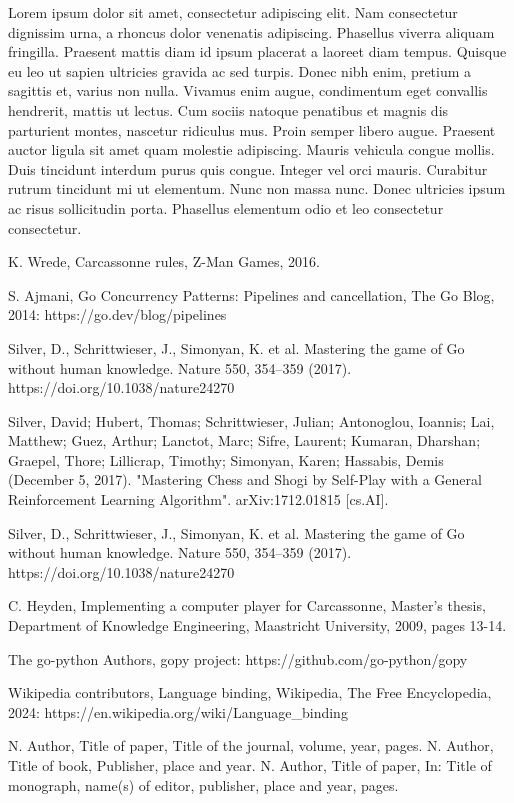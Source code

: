 \documentclass[11pt,twocolumn]{article}
\begin{document}
Lorem ipsum dolor sit amet, consectetur adipiscing elit. Nam consectetur dignissim urna, a rhoncus dolor venenatis adipiscing. Phasellus viverra aliquam fringilla. Praesent mattis diam id ipsum placerat a laoreet diam tempus. Quisque eu leo ut sapien ultricies gravida ac sed turpis. Donec nibh enim, pretium a sagittis et, varius non nulla. Vivamus enim augue, condimentum eget convallis hendrerit, mattis ut lectus. Cum sociis natoque penatibus et magnis dis parturient montes, nascetur ridiculus mus. Proin semper libero augue. Praesent auctor ligula sit amet quam molestie adipiscing. Mauris vehicula congue mollis. Duis tincidunt interdum purus quis congue. Integer vel orci mauris. Curabitur rutrum tincidunt mi ut elementum. Nunc non massa nunc. Donec ultricies ipsum ac risus sollicitudin porta. Phasellus elementum odio et leo consectetur consectetur. 


\begin{thebibliography}{00}
K. Wrede, Carcassonne rules, Z-Man Games, 2016.

S. Ajmani, Go Concurrency Patterns: Pipelines and cancellation, The Go Blog, 2014: https://go.dev/blog/pipelines

Silver, D., Schrittwieser, J., Simonyan, K. et al. Mastering the game of Go without human knowledge. Nature 550, 354–359 (2017). https://doi.org/10.1038/nature24270

 Silver, David; Hubert, Thomas; Schrittwieser, Julian; Antonoglou, Ioannis; Lai, Matthew; Guez, Arthur; Lanctot, Marc; Sifre, Laurent; Kumaran, Dharshan; Graepel, Thore; Lillicrap, Timothy; Simonyan, Karen; Hassabis, Demis (December 5, 2017). "Mastering Chess and Shogi by Self-Play with a General Reinforcement Learning Algorithm". arXiv:1712.01815 [cs.AI].

Silver, D., Schrittwieser, J., Simonyan, K. et al. Mastering the game of Go without human knowledge. Nature 550, 354–359 (2017). https://doi.org/10.1038/nature24270

C. Heyden, Implementing a computer player for Carcassonne, Master's thesis, Department of Knowledge Engineering, Maastricht University, 2009,
pages 13-14.

The go-python Authors, gopy project: https://github.com/go-python/gopy

Wikipedia contributors, Language binding, Wikipedia, The Free Encyclopedia, 2024:
https://en.wikipedia.org/wiki/Language\_binding

N. Author, Title of paper, Title of the journal, volume, year,
pages.
N. Author, Title of book, Publisher, place and
year.
N. Author, Title of paper, In: Title of monograph, name(s) of editor, publisher, place and year, pages.
\end{thebibliography}
\end{document}
